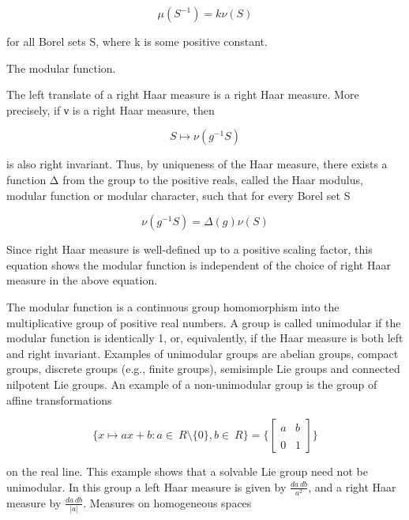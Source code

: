 \documentclass[oneside,12pt]{memoir}
\begin{document}
\begin{equation*}
\mu(S^{-1})=k\nu(S)
\end{equation*}

for all Borel sets S, where k is some positive constant.

The modular function.

The left translate of a right Haar measure is a right Haar measure. More precisely, if ν is a right Haar measure, then

\begin{equation*}
S \mapsto \nu (g^{-1} S)
\end{equation*}

is also right invariant. Thus, by uniqueness of the Haar measure, there exists a function Δ from the group to the positive reals, called the Haar modulus, modular function or modular character, such that for every Borel set S

\begin{equation*}
\nu (g^{-1} S) = \Delta(g) \nu(S)
\end{equation*}

Since right Haar measure is well-defined up to a positive scaling factor, this equation shows the modular function is independent of the choice of right Haar measure in the above equation.

The modular function is a continuous group homomorphism into the multiplicative group of positive real numbers. A group is called unimodular if the modular function is identically 1, or, equivalently, if the Haar measure is both left and right invariant. Examples of unimodular groups are abelian groups, compact groups, discrete groups (e.g., finite groups), semisimple Lie groups and connected nilpotent Lie groups. An example of a non-unimodular group is the group of affine transformations

\begin{equation*}
\big\{ x \mapsto a x + b : a\in\ R\setminus\{0\}, b\in\ R \big\}=\big\{\begin{bmatrix} a & b \\ \\ 0 & 1 \end{bmatrix}\big\}
\end{equation*}

on the real line. This example shows that a solvable Lie group need not be unimodular. In this group a left Haar measure is given by $\frac{da\,db}{a^2}$, and a right Haar measure by $\frac{da\,db}{|a|}$.
Measures on homogeneous spaces
\end{document}

